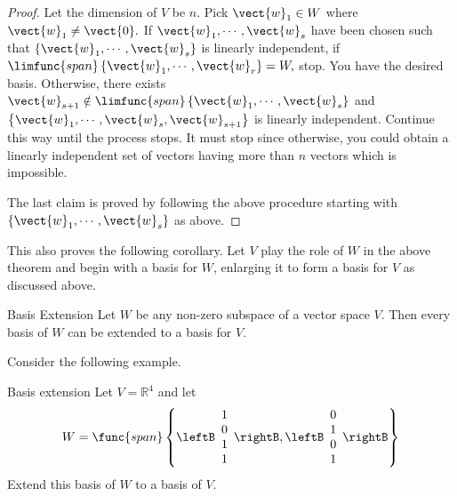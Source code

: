 \begin{proof}
Let the dimension of $V$ be $n$. Pick $\vect{w}_{1}\in W$
where $\vect{w}_{1}\neq \vect{0}.$ If $\vect{w}_{1},\cdots ,\vect{w}_{s}$ have
been chosen such that $\left\{ \vect{w}_{1},\cdots ,\vect{w}_{s}\right\} $ is
linearly independent, if $\limfunc{span}\left\{ \vect{w}_{1},\cdots ,\vect{w}
_{r}\right\} =W,$ stop. You have the desired basis. Otherwise, there exists $
\vect{w}_{s+1}\notin \limfunc{span}\left\{ \vect{w}_{1},\cdots ,\vect{w}
_{s}\right\} $ and $\left\{ \vect{w}_{1},\cdots ,
\vect{w}_{s},\vect{w}_{s+1}\right\} $ is linearly independent. Continue this
way until the process stops. It must stop since otherwise, you could obtain a
linearly independent set of vectors having more than $n$ vectors which is
impossible.

The last claim is proved by following the above procedure starting with $
\left\{ \vect{w}_{1},\cdots ,\vect{w}_{s}\right\} $ as above. 
\end{proof}

This also proves the following corollary. Let $V$ play the role of $
W$ in the above theorem and begin with a basis for $W$, enlarging it to form
a basis for $V$ as discussed above.

\begin{corollary}{Basis Extension}{}
Let $W$ be any non-zero subspace of a vector space $V$.
Then every basis of $W$ can be extended to a basis for $V$.
\end{corollary}

Consider the following example.

\begin{example}{Basis extension}{}
Let $V=\mathbb{R}^{4}$ and let 
\begin{equation*}
W=\func{span}\left\{ \leftB 
\begin{array}{c}
1 \\ 
0 \\ 
1 \\ 
1
\end{array}
\rightB ,\leftB 
\begin{array}{c}
0 \\ 
1 \\ 
0 \\ 
1
\end{array}
\rightB \right\}
\end{equation*}
Extend this basis of $W$ to a basis of $V$.
\end{example}

